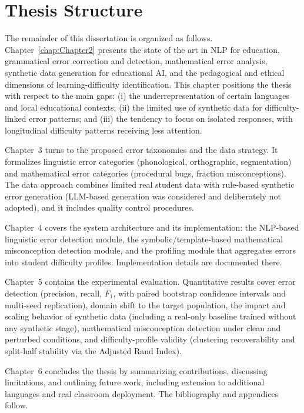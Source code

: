 \section{Thesis Structure}
\label{sec:structure}

The remainder of this dissertation is organized as follows. Chapter~\ref{chap:Chapter2} presents the state of the art in NLP for education, grammatical error correction and detection, mathematical error analysis, synthetic data generation for educational AI, and the pedagogical and ethical dimensions of learning-difficulty identification. This chapter positions the thesis with respect to the main gaps: (i) the underrepresentation of certain languages and local educational contexts; (ii) the limited use of synthetic data for difficulty-linked error patterns; and (iii) the tendency to focus on isolated responses, with longitudinal difficulty patterns receiving less attention.

Chapter~3 turns to the proposed error taxonomies and the data strategy. It formalizes linguistic error categories (phonological, orthographic, segmentation) and mathematical error categories (procedural bugs, fraction misconceptions). The data approach combines limited real student data with rule-based synthetic error generation (LLM-based generation was considered and deliberately not adopted), and it includes quality control procedures.

Chapter~4 covers the system architecture and its implementation: the NLP-based linguistic error detection module, the symbolic/template-based mathematical misconception detection module, and the profiling module that aggregates errors into student difficulty profiles. Implementation details are documented there.

Chapter~5 contains the experimental evaluation. Quantitative results cover error detection (precision, recall, \(F_1\), with paired bootstrap confidence intervals and multi-seed replication), domain shift to the target population, the impact and scaling behavior of synthetic data (including a real-only baseline trained without any synthetic stage), mathematical misconception detection under clean and perturbed conditions, and difficulty-profile validity (clustering recoverability and split-half stability via the Adjusted Rand Index).

Chapter~6 concludes the thesis by summarizing contributions, discussing limitations, and outlining future work, including extension to additional languages and real classroom deployment. The bibliography and appendices follow.